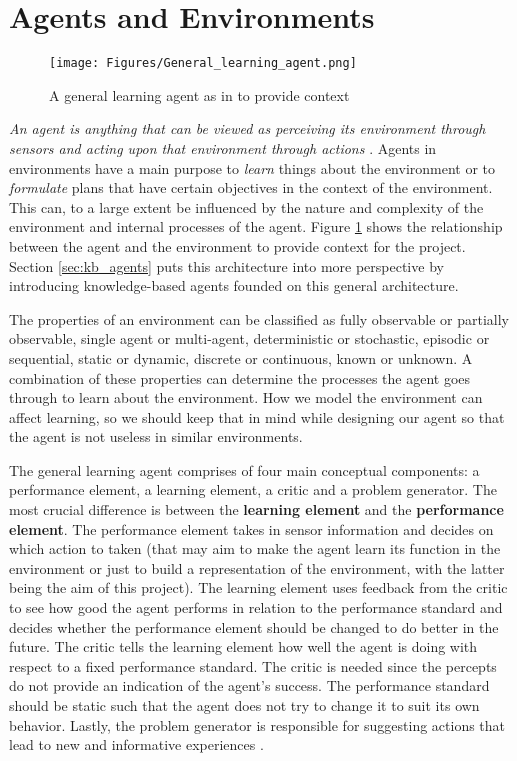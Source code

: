 \section{Agents and Environments}
\label{sec:agents_and_environments}
\begin{figure}[H]
    \centering
    \texttt{[image: Figures/General\_learning\_agent.png]}
    \caption{A general learning agent as in \citep{russell2016artificial} to provide context}
    \label{fig:agent_environment}
\end{figure}
\textit{An agent is anything that can be viewed as perceiving its environment through sensors and acting upon that environment through actions} \citep{russell2016artificial}. Agents in environments have a main purpose to \textit{learn} things about the environment or to \textit{formulate} plans that have certain objectives in the context of the environment. This can, to a large extent be influenced by the nature and complexity of the environment and internal processes of the agent. Figure \ref{fig:agent_environment} shows the relationship between the agent and the environment to provide context for the project. Section \ref{sec:kb_agents} puts this architecture into more perspective by introducing knowledge-based agents founded on this general architecture. 

The properties of an environment can be classified as fully observable or partially observable, single agent or multi-agent, deterministic or stochastic, episodic or sequential, static or dynamic, discrete or continuous, known or unknown. A combination of these properties can determine the processes the agent goes through to learn about the environment. How we model the environment can affect learning, so we should keep that in mind while designing our agent so that the agent is not useless in similar environments.

The general learning agent comprises of four main conceptual components: a performance element, a learning element, a critic and a problem generator. The most crucial difference is between the \textbf{learning element} and the \textbf{performance element}. The performance element takes in sensor information and decides on which action to taken (that may aim to make the agent learn its function in the environment or just to build a representation of the environment, with the latter being the aim of this project). The learning element uses feedback from the critic to see how good the agent performs in relation to the performance standard and decides whether the performance element should be changed to do better in the future. The critic tells the learning element how well the agent is doing with respect to a fixed performance standard. The critic is needed since the percepts do not provide an indication of the agent’s success. The performance standard should be static such that the agent does not try to change it to suit its own behavior. Lastly, the problem generator is responsible for suggesting actions that lead to new and informative experiences \citep{russell2016artificial}. 


